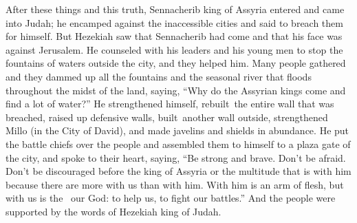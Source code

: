 
\begin{inparaenum}
   After these things and this truth, Sennacherib king of Assyria entered and came into Judah; he encamped against the inaccessible cities and said to breach them for himself.%
   But Hezekiah saw that Sennacherib had come and that his face was against Jerusalem.%
   He counseled with his leaders and his young men to stop the fountains of waters outside the city, and they helped him.%
   Many people gathered and they dammed up all the fountains and the seasonal river that floods throughout the midst of the land, saying, ``Why do the Assyrian kings come and find a lot of water?''%
   He strengthened himself, rebuilt\thinspace\understood\ the entire wall that was breached, raised up defensive walls, built\understood\ another wall outside, strengthened Millo (in the City of David), and made javelins and shields in abundance.%
   He put the battle chiefs over the people and assembled them to himself to a plaza gate of the city, and spoke to their heart, saying,%
   ``Be strong and brave. Don't be afraid. Don't be discouraged before the king of Assyria or the multitude that is with him because there are more with us than with him.%
   With him is an arm of flesh, but with us is the \lord\ our God: to help us, to fight our battles.'' And the people were supported by the words of Hezekiah king of Judah.%
  

\end{inparaenum}
